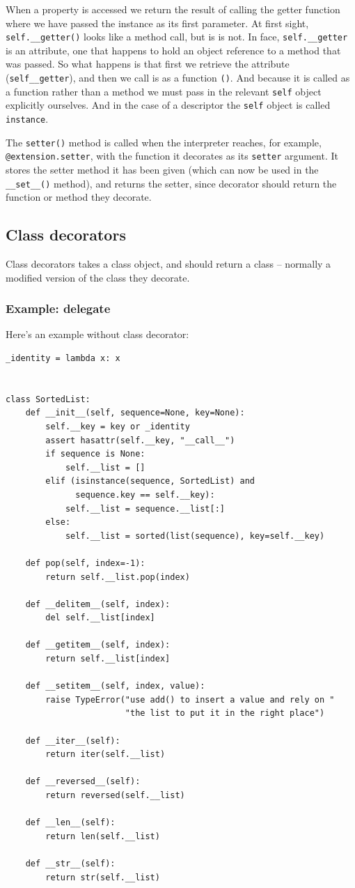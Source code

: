 When a property is accessed we return the result of calling the getter function where we have passed the instance as its first parameter.
At first sight, \verb|self.__getter()| looks like a method call, but is is not.
In face, \verb|self.__getter| is an attribute, one that happens to hold an object reference to a method that was passed.
So what happens is that first we retrieve the attribute (\verb|self__getter|), and then we call is as a function \verb|()|.
And because it is called as a function rather than a method we must pass in the relevant \verb|self| object explicitly ourselves.
And in the case of a descriptor the \verb|self| object is called \verb|instance|.

The \verb|setter()| method is called when the interpreter reaches, for example, \verb|@extension.setter|, with the function it decorates as its \verb|setter| argument.
It stores the setter method it has been given (which can now be used in the \verb|__set__()| method), and returns the setter, since decorator should return the function or method they decorate.


\subsection{Class decorators}

Class decorators takes a class object, and should return a class -- normally a modified version of the class they decorate.


\subsubsection{Example:  delegate}

Here's an example without class decorator:
\begin{lstlisting}
_identity = lambda x: x


class SortedList:
    def __init__(self, sequence=None, key=None):
        self.__key = key or _identity
        assert hasattr(self.__key, "__call__")
        if sequence is None:
            self.__list = []
        elif (isinstance(sequence, SortedList) and
              sequence.key == self.__key):
            self.__list = sequence.__list[:]
        else:
            self.__list = sorted(list(sequence), key=self.__key)

    def pop(self, index=-1):
        return self.__list.pop(index)

    def __delitem__(self, index):
        del self.__list[index]

    def __getitem__(self, index):
        return self.__list[index]

    def __setitem__(self, index, value):
        raise TypeError("use add() to insert a value and rely on "
                        "the list to put it in the right place")

    def __iter__(self):
        return iter(self.__list)

    def __reversed__(self):
        return reversed(self.__list)

    def __len__(self):
        return len(self.__list)

    def __str__(self):
        return str(self.__list)
\end{lstlisting}


